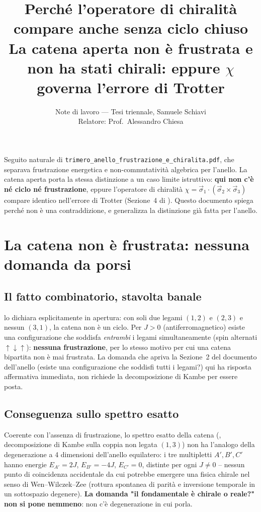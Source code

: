 \documentclass[11pt,a4paper]{article}
\title{\vspace{-1.5em}\color{inkblue}Perché l'operatore di chiralità compare anche senza ciclo chiuso\\[0.1em]\Large\normalfont\color{softgray}La catena aperta non è frustrata e non ha stati chirali: eppure $\chi$ governa l'errore di Trotter}
\author{Note di lavoro --- Tesi triennale, Samuele Schiavi\\ Relatore: Prof.\ Alessandro Chiesa}
\date{}
\begin{document}
\sloppy
\maketitle
\thispagestyle{fancy}
\vspace{-2em}

Seguito naturale di \texttt{trimero\_anello\_frustrazione\_e\_chiralita.pdf},
che separava frustrazione energetica e non-commutatività algebrica per
l'anello. La catena aperta porta la stessa distinzione a un caso limite
istruttivo: \textbf{qui non c'è né ciclo né frustrazione}, eppure
l'operatore di chiralità $\chi=\vec\sigma_1\cdot(\vec\sigma_2\times\vec\sigma_3)$
compare identico nell'errore di Trotter (Sezione~4 di
\texttt{}). Questo
documento spiega perché non è una contraddizione, e generalizza la
distinzione già fatta per l'anello.

\section{La catena non è frustrata: nessuna domanda da porsi}

\subsection{Il fatto combinatorio, stavolta banale}

\texttt{} lo dichiara esplicitamente in
apertura: con soli due legami $(1,2)$ e $(2,3)$ e nessun $(3,1)$, la catena
non è un ciclo. Per $J>0$ (antiferromagnetico) esiste una configurazione
che soddisfa \emph{entrambi} i legami simultaneamente (spin alternati
$\uparrow\downarrow\uparrow$): \textbf{nessuna frustrazione}, per lo stesso
motivo per cui una catena bipartita non è mai frustrata. La domanda che
apriva la Sezione~2 del documento dell'anello (esiste una configurazione
che soddisfi tutti i legami?) qui ha risposta affermativa immediata, non
richiede la decomposizione di Kambe per essere posta.

\subsection{Conseguenza sullo spettro esatto}

Coerente con l'assenza di frustrazione, lo spettro esatto della catena
(\texttt{}, decomposizione di Kambe sulla
coppia non legata $(1,3)$) non ha l'analogo della degenerazione a 4 dimensioni
dell'anello equilatero: i tre multipletti $A',B',C'$ hanno energie
$E_{A'}=2J$, $E_{B'}=-4J$, $E_{C'}=0$, distinte per ogni $J\neq0$ -- nessun
punto di coincidenza accidentale da cui potrebbe emergere una fisica
chirale nel senso di Wen--Wilczek--Zee (rottura spontanea di parità e
inversione temporale in un sottospazio degenere). \textbf{La domanda "il
fondamentale è chirale o reale?" non si pone nemmeno}: non c'è degenerazione
in cui porla.
\end{document}
